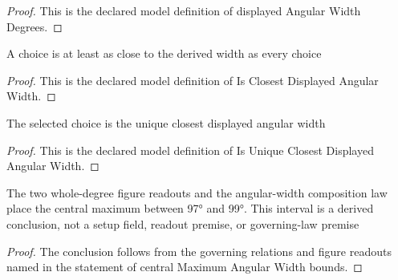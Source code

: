\begin{proof}
  This is the declared model definition of displayed Angular Width Degrees.
\end{proof}
\begin{definition}
  \label{def:physics:phyx-mini-0126:phyxminiproblems-problemphyxmini0126-isclosestdisplayedangularwidth}
  A choice is at least as close to the derived width as every choice
\end{definition}
\begin{proof}
  This is the declared model definition of Is Closest Displayed Angular Width.
\end{proof}
\begin{definition}
  \label{def:physics:phyx-mini-0126:phyxminiproblems-problemphyxmini0126-isuniqueclosestdisplayedangularwidth}
  The selected choice is the unique closest displayed angular width
\end{definition}
\begin{proof}
  This is the declared model definition of Is Unique Closest Displayed Angular Width.
\end{proof}
\begin{lemma}
  \label{lem:physics:phyx-mini-0126:phyxminiproblems-problemphyxmini0126-centralmaximumangularwidth-bounds}
  The two whole-degree figure readouts and the angular-width composition law place the central maximum between 97° and 99°. This interval is a derived conclusion, not a setup field, readout premise, or governing-law premise
\end{lemma}
\begin{proof}
  The conclusion follows from the governing relations and figure readouts named in the statement of central Maximum Angular Width bounds.
\end{proof}
